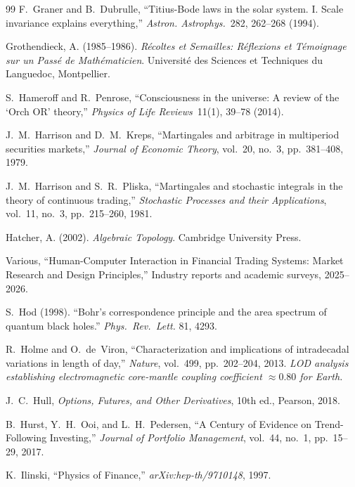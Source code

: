 \documentclass[12pt,oneside]{book}
\theoremstyle{principia}
\theoremstyle{definition}
\theoremstyle{remark}
\begin{document}
\begin{thebibliography}{99}
F.~Graner and B.~Dubrulle, ``Titius-Bode laws in the solar system. I. Scale invariance explains everything,'' \emph{Astron. Astrophys.}\ 282, 262--268 (1994).

Grothendieck, A. (1985--1986). \emph{R\'ecoltes et Semailles: R\'eflexions et T\'emoignage sur un Pass\'e de Math\'ematicien}. Universit\'e des Sciences et Techniques du Languedoc, Montpellier.

S.~Hameroff and R.~Penrose, ``Consciousness in the universe: A review of the `Orch OR' theory,'' \emph{Physics of Life Reviews}\ 11(1), 39--78 (2014).

J.~M.~Harrison and D.~M.~Kreps,
``Martingales and arbitrage in multiperiod securities markets,''
\emph{Journal of Economic Theory}, vol.~20, no.~3, pp.~381--408, 1979.

J.~M.~Harrison and S.~R.~Pliska,
``Martingales and stochastic integrals in the theory of continuous trading,''
\emph{Stochastic Processes and their Applications}, vol.~11, no.~3, pp.~215--260, 1981.

Hatcher, A. (2002). \emph{Algebraic Topology}. Cambridge University Press.

Various,
``Human-Computer Interaction in Financial Trading Systems: Market Research and Design Principles,''
Industry reports and academic surveys, 2025--2026.

S.~Hod (1998).
``Bohr's correspondence principle and the area spectrum of quantum black holes.''
\textit{Phys.\ Rev.\ Lett.} 81, 4293.

R.~Holme and O.~de~Viron,
``Characterization and implications of intradecadal variations in length of day,''
\emph{Nature}, vol.~499, pp.~202--204, 2013.
\textit{LOD analysis establishing electromagnetic core-mantle coupling coefficient
$\approx 0.80$ for Earth.}

J.~C.~Hull,
\emph{Options, Futures, and Other Derivatives},
10th ed., Pearson, 2018.

B.~Hurst, Y.~H.~Ooi, and L.~H.~Pedersen,
``A Century of Evidence on Trend-Following Investing,''
\emph{Journal of Portfolio Management}, vol.~44, no.~1, pp.~15--29, 2017.

K.~Ilinski,
``Physics of Finance,''
\emph{arXiv:hep-th/9710148}, 1997.


\end{thebibliography}
\end{document}
